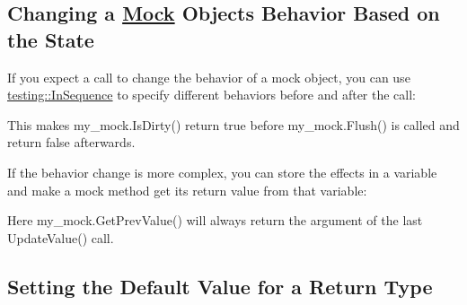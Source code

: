\subsection*{Changing a \mbox{\hyperlink{class_mock}{Mock}} Object\textquotesingle{}s Behavior Based on the State}

If you expect a call to change the behavior of a mock object, you can use {\ttfamily \mbox{\hyperlink{classtesting_1_1_in_sequence}{testing\+::\+In\+Sequence}}} to specify different behaviors before and after the call\+:


\begin{DoxyCode}{0}
\DoxyCodeLine{}
\DoxyCodeLine{  \{}
\DoxyCodeLine{  \}}
\end{DoxyCode}


This makes {\ttfamily my\+\_\+mock.\+Is\+Dirty()} return {\ttfamily true} before {\ttfamily my\+\_\+mock.\+Flush()} is called and return {\ttfamily false} afterwards.

If the behavior change is more complex, you can store the effects in a variable and make a mock method get its return value from that variable\+:


\begin{DoxyCode}{0}
\DoxyCodeLine{}
\end{DoxyCode}


Here {\ttfamily my\+\_\+mock.\+Get\+Prev\+Value()} will always return the argument of the last {\ttfamily Update\+Value()} call.

\subsection*{Setting the Default Value for a Return Type}


